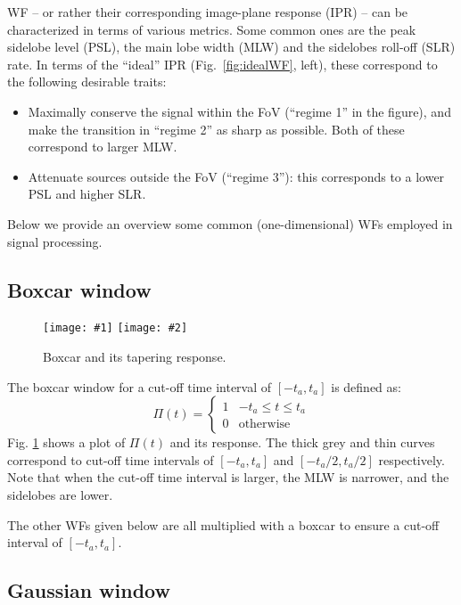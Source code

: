 \documentclass[useAMS,usenatbib]{mn2e}
\begin{document}
WF -- or rather their corresponding image-plane response (IPR) -- can be characterized in terms of various metrics. Some common 
ones are the peak sidelobe level (PSL), the main lobe width (MLW) and the sidelobes roll-off (SLR) rate. In terms of the ``ideal'' 
IPR (Fig.~\ref{fig:idealWF}, left), these correspond to the following desirable traits:

\begin{itemize}
\item Maximally conserve the signal within the FoV (``regime 1'' in the figure), and make the transition in ``regime 2'' as sharp as possible. Both of these correspond to larger MLW.
\item Attenuate sources outside the FoV (``regime 3''): this corresponds to a lower PSL and higher SLR.
\end{itemize}

Below we provide an overview some common (one-dimensional) WFs employed in signal processing.

\newcommand{\FilterFigure}[4]{
\begin{figure}
\texttt{[image: \#1]}%
\texttt{[image: \#2]}
\caption{#3}\label{#4}
\end{figure}
}

\subsection{Boxcar window}

\FilterFigure{Figures/boxcargrey.png}{Figures/freq_resp_boxgrey.png}{Boxcar and its tapering response.}{fig:wf:box}

The boxcar window for a cut-off time interval of $[-t_a,t_a]$ is defined as:
\begin{equation}
\Pi(t)=\left\{
\begin{array}{rl}
1 & \mbox{$-t_a \leq t \leq t_a$} \\
0 & \mbox{otherwise}
\end{array}\right.
\end{equation}
Fig. \ref{fig:wf:box} shows a plot of $\Pi(t)$ and its response. The thick grey and thin curves 
correspond to cut-off time intervals of $[-t_a, t_a]$ and 
$[-t_a/2,t_a/2]$ respectively. Note that when the cut-off time interval is larger, the MLW is 
narrower, and the sidelobes are lower.

The other WFs given below are all multiplied with a boxcar to ensure a cut-off interval of $[-t_a,t_a]$.

\subsection{Gaussian window}
\end{document}
